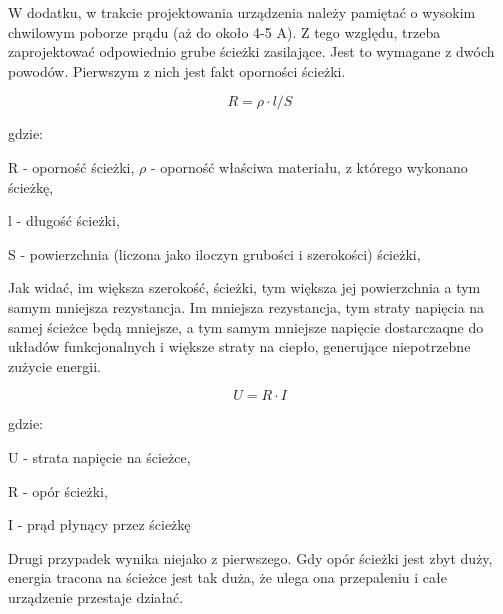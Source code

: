 W dodatku, w trakcie projektowania urządzenia należy pamiętać o wysokim chwilowym poborze prądu (aż do około 4-5 A). Z tego względu, trzeba zaprojektować odpowiednio grube ścieżki zasilające. Jest to wymagane z dwóch powodów. Pierwszym z nich jest fakt oporności ścieżki.

\begin{equation}
 R = \rho \cdot l / S 
 \label{eq_pcb_wire_resistance}
\end{equation}

gdzie:

R - oporność ścieżki,
$\rho$ - oporność właściwa materiału, z którego wykonano ścieżkę,

l - długość ścieżki,

S - powierzchnia (liczona jako iloczyn grubości i szerokości) ścieżki,

Jak widać, im większa szerokość, ścieżki, tym większa jej powierzchnia a tym samym mniejsza rezystancja. Im mniejsza rezystancja, tym straty napięcia na samej ścieżce będą mniejsze, a tym samym mniejsze napięcie dostarczaqne do układów funkcjonalnych i większe straty na ciepło, generujące niepotrzebne zużycie energii.

\begin{equation}
 U = R \cdot I
 \label{eq_voltage_drop_on_pcb_wire} 
\end{equation}

 gdzie:
 
 U - strata napięcie na ścieżce,
 
 R - opór ścieżki,
 
 I - prąd płynący przez ścieżkę
 
Drugi przypadek wynika niejako z pierwszego. Gdy opór ścieżki jest zbyt duży, energia tracona na ścieżce jest tak duża, że ulega ona przepaleniu i całe urządzenie przestaje działać.


 

